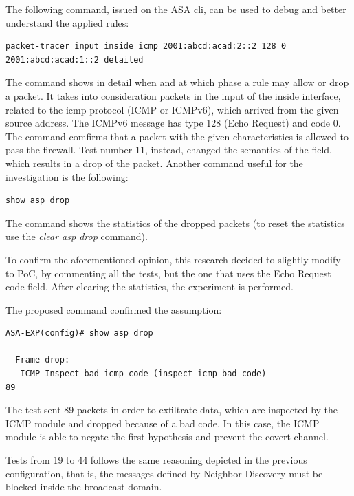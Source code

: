 \documentclass[12pt]{article}
\begin{document}
The following command, issued on the ASA cli, can be used to debug and better understand the applied rules:

\begin{lstlisting}[style=python,basicstyle=\ttfamily\small]
 packet-tracer input inside icmp 2001:abcd:acad:2::2 128 0 2001:abcd:acad:1::2 detailed
\end{lstlisting}

The command shows in detail when and at which phase a rule may allow or drop a packet. It takes into consideration packets in the input of the inside interface, related to the icmp protocol (ICMP or ICMPv6), which arrived from the given source address. The ICMPv6 message has type 128 (Echo Request) and code 0. The command comfirms that a packet with the given characteristics is allowed to pass the firewall. Test number 11, instead, changed the semantics of the field, which results in a drop of the packet. Another command useful for the investigation is the following:

\begin{lstlisting}[style=python,basicstyle=\ttfamily\small]
 show asp drop
\end{lstlisting}
\vspace{-10pt}
The command shows the statistics of the dropped packets (to reset the statistics use the \textit{clear asp drop} command).

To confirm the aforementioned opinion, this research decided to slightly modify to PoC, by commenting all the tests, but the one that uses the Echo Request code field. After clearing the statistics, the experiment is performed. 

The proposed command confirmed the assumption:

\begin{lstlisting}[style=python,basicstyle=\ttfamily\small]
 ASA-EXP(config)# show asp drop

  Frame drop:
   ICMP Inspect bad icmp code (inspect-icmp-bad-code)                          89
\end{lstlisting}

The test sent 89 packets in order to exfiltrate data, which are inspected by the ICMP module and dropped because of a bad code. In this case, the ICMP module is able to negate the first hypothesis and prevent the covert channel.

Tests from 19 to 44 follows the same reasoning depicted in the previous configuration, that is, the messages defined by Neighbor Discovery must be blocked inside the broadcast domain. 
\end{document}
